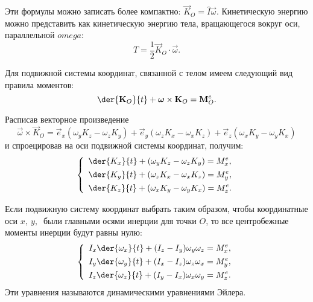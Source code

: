 Эти формулы можно записать более компактно: \( \vec{K}_O = \hat{I}\vec{\omega}
\). Кинетическую энергию можно представить как кинетическую энергию тела,
вращающегося вокруг оси, параллельной \( omega \):
\[
    T = \frac{1}{2}\vec{K}_O\cdot\vec{\omega}.
\] 

Для подвижной системы координат, связанной с телом имеем следующий вид правила
моментов:
\[
    \der{\vec{K}_O}{t} + \vec{\omega} \times\vec{K}_O = \vec{M}^e_O.
\]

Расписав векторное произведение
\[
    \vec{\omega}\times\vec{K}_O = \vec{e}_x(\omega_y K_z - \omega_z K_y) +
    \vec{e}_y(\omega_z K_x - \omega_x K_z) + \vec{e}_z(\omega_x K_y -
    \omega_y K_x)
\]
и спроецировав на оси подвижной системы координат, получим:
\[
    \left\{ \begin{array}{l}
        \ds \der{K_x}{t} + (\omega_y K_z - \omega_z K_y) = M^e_x, \\[.4em]
        \ds \der{K_y}{t} + (\omega_z K_x - \omega_x K_z) = M^e_y, \\[.4em]
        \ds \der{K_z}{t} + (\omega_x K_y - \omega_y K_x) = M^e_z.
    \end{array} \right.
\]

Если подвижную систему координат выбрать таким образом, чтобы координатные оси
\( x,\ y,\ \) были главными осями инерции для точки \( O \), то все центробежные
моменты инерции будут равны нулю:
\[
    \left\{ \begin{array}{l}
        \ds I_x\der{\omega_x}{t} + (I_z -  I_y)\omega_y\omega_z = M^e_x, \\[.4em]
        \ds I_y\der{\omega_y}{t} + (I_x -  I_z)\omega_z\omega_x = M^e_y, \\[.4em]
        \ds I_z\der{\omega_z}{t} + (I_y -  I_x)\omega_x\omega_y = M^e_z.
    \end{array} \right.
\] 
Эти уравнения называются динамическими уравнениями Эйлера.

\newpage
